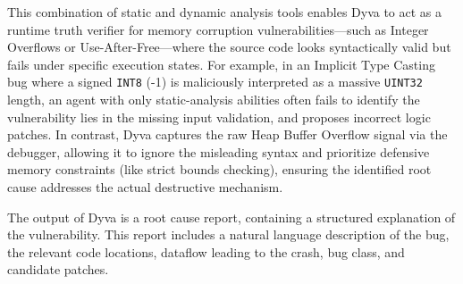 This combination of static and dynamic analysis tools enables Dyva to act as a runtime truth verifier for memory corruption vulnerabilities—such as Integer Overflows or Use-After-Free—where the source code looks syntactically valid but fails  under specific execution states.
For example, in an Implicit Type Casting bug where a signed \texttt{INT8} (-1) is maliciously interpreted as a massive \texttt{UINT32} length, an agent with only static-analysis abilities often fails to identify the vulnerability lies in the missing input validation, and proposes incorrect logic patches. 
In contrast, Dyva captures the raw Heap Buffer Overflow signal via the debugger, allowing it to ignore the misleading syntax and prioritize defensive memory constraints (like strict bounds checking), ensuring the identified root cause addresses the actual destructive mechanism.


The output of Dyva is a root cause report, containing a structured explanation of the vulnerability. 
This report includes a natural language description of the bug, the relevant code locations, dataflow leading to the crash, bug class, and candidate patches. 
